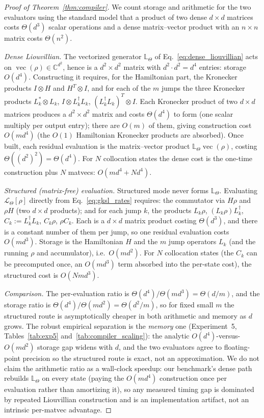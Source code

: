 \documentclass[twocolumn,aps,prxquantum,superscriptaddress,nofootinbib,floatfix,longbibliography]{revtex4-2}
\newcommand{\C}{\mathbb{C}}
\newcommand{\calL}{\mathcal{L}}
\begin{document}
\begin{proof}[Proof of Theorem~\ref{thm:compiler}]
We count storage and arithmetic for the two evaluators using the standard model that a product of two dense $d\times d$ matrices costs $\Theta(d^3)$ scalar operations and a dense matrix--vector product with an $n\times n$ matrix costs $\Theta(n^2)$.

\emph{Dense Liouvillian.} The vectorized generator $\mathbb{L}_\Theta$ of Eq.~\eqref{eq:dense_liouvillian} acts on $\operatorname{vec}(\rho)\in\C^{d^2}$, hence is a $d^2\times d^2$ matrix with $d^2\cdot d^2=d^4$ entries: storage $O(d^4)$. Constructing it requires, for the Hamiltonian part, the Kronecker products $I\otimes H$ and $H^T\otimes I$, and for each of the $m$ jumps the three Kronecker products $L_k^*\otimes L_k$, $I\otimes L_k^\dagger L_k$, $(L_k^\dagger L_k)^T\otimes I$. Each Kronecker product of two $d\times d$ matrices produces a $d^2\times d^2$ matrix and costs $\Theta(d^4)$ to form (one scalar multiply per output entry); there are $O(m)$ of them, giving construction cost $O(md^4)$ (the $O(1)$ Hamiltonian Kronecker products are absorbed). Once built, each residual evaluation is the matrix--vector product $\mathbb{L}_\Theta\operatorname{vec}(\rho)$, costing $\Theta((d^2)^2)=\Theta(d^4)$. For $N$ collocation states the dense cost is the one-time construction plus $N$ matvecs: $O(md^4+Nd^4)$.

\emph{Structured (matrix-free) evaluation.} Structured mode never forms $\mathbb{L}_\Theta$. Evaluating $\calL_\Theta[\rho]$ directly from Eq.~\eqref{eq:gksl_rates} requires: the commutator via $H\rho$ and $\rho H$ (two $d\times d$ products); and for each jump $k$, the products $L_k\rho$, $(L_k\rho)L_k^\dagger$, $C_k:=L_k^\dagger L_k$, $C_k\rho$, $\rho C_k$. Each is a $d\times d$ matrix product costing $\Theta(d^3)$, and there is a constant number of them per jump, so one residual evaluation costs $O(md^3)$. Storage is the Hamiltonian $H$ and the $m$ jump operators $L_k$ (and the running $\rho$ and accumulator), i.e.\ $O(md^2)$. For $N$ collocation states (the $C_k$ can be precomputed once, an $O(md^3)$ term absorbed into the per-state cost), the structured cost is $O(Nmd^3)$.

\emph{Comparison.} The per-evaluation ratio is $\Theta(d^4)/\Theta(md^3)=\Theta(d/m)$, and the storage ratio is $\Theta(d^4)/\Theta(md^2)=\Theta(d^2/m)$, so for fixed small $m$ the structured route is asymptotically cheaper in both arithmetic and memory as $d$ grows. The robust empirical separation is the \emph{memory} one (Experiment~5, Tables~\ref{tab:exp5} and~\ref{tab:compiler_scaling}): the analytic $O(d^4)$-versus-$O(md^2)$ storage gap widens with $d$, and the two evaluators agree to floating-point precision so the structured route is exact, not an approximation. We do not claim the arithmetic ratio as a wall-clock speedup: our benchmark's dense path rebuilds $\mathbb{L}_\Theta$ on every state (paying the $O(md^4)$ construction once per evaluation rather than amortizing it), so any measured timing gap is dominated by repeated Liouvillian construction and is an implementation artifact, not an intrinsic per-matvec advantage.
\end{proof}
\end{document}

